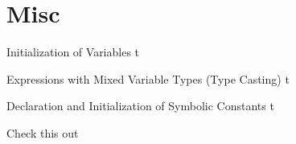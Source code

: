 \documentclass[../lecture2-variablesandcontrolstructures.tex]{subfiles}
\begin{document}
\section{Misc}


\begin{frame}[fragile]{Initialization of Variables}
t
\end{frame}


\begin{frame}[fragile]{Expressions with Mixed Variable Types (Type Casting)}
t
\end{frame}


\begin{frame}[fragile]{Declaration and Initialization of Symbolic Constants}
t
\end{frame}


\begin{frame}[fragile]{Check this out}
    \begin{center}
    \end{center}
\end{frame}

\end{document}
